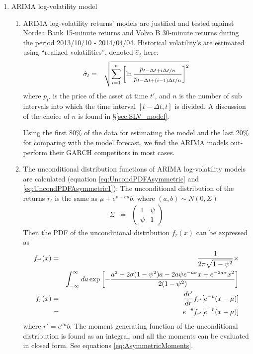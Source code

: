 \documentclass{report}
\begin{document}
\begin{enumerate}
\item ARIMA log-volatility model
  \begin{enumerate}
  \item ARIMA log-volatility returns' models are justified and tested
    against Nordea Bank 15-minute returns and Volvo B 30-minute returns
    during the period 2013/10/10 - 2014/04/04. Historical volatility's
    are estimated using ``realized volatilities'', denoted
    $\hat{\sigma}_t$ here:
    \begin{eqnarray*}
      \hat{\sigma}_t &=& \sqrt{
        \sum_{i = 1}^n \left[\ln {p_{t - \Delta t + i \Delta t / n} \over
            p_{t - \Delta t + (i-1) \Delta t / n}} \right]^2
      }
    \end{eqnarray*}
    where $p_{t'}$ is the price of the asset at time $t'$, and $n$ is
    the number of sub intervals into which the time interval $[t -
    \Delta t, t]$ is divided. A discussion of the choice of $n$ is found
    in \S\ref{sec:SLV_model}.

    Using the first 80\% of the data for estimating the model and the
    last 20\% for comparing with the model forecast, we find the ARIMA
    models out-perform their GARCH competitors in most cases.

  \item The unconditional distribution functions of ARIMA
    log-volatility models are calculated (equation
    \ref{eq:UncondPDFAsymmetric} and \ref{eq:UncondPDFAsymmetric1}):
    The unconditional distribution of  the returns $r_t$ is the same as
    $\mu + e^{\bar{v} + \sigma a} b$, where $(a, b) \sim N(0, \Sigma)$
    \begin{eqnarray*}
      \Sigma &=&
      \begin{pmatrix}
        1 & \psi \\
        \psi & 1
      \end{pmatrix}
    \end{eqnarray*}
    Then the PDF of the unconditional distribution $f_r(x)$ can be expressed as
    \begin{eqnarray*}
      f_{r'}(x) &=& {1 \over 2\pi \sqrt{1 - \psi^2}} \times \\
      && \int_{-\infty}^\infty da \exp
      \left[- {
          a^2 + 2\sigma(1 - \psi^2)a - 2a\psi e^{-a\sigma} x + e^{-2a\sigma} x^2
          \over
          2(1 - \psi^2)
        }
      \right] \\
      f_r(x) &=&  \frac{d r'}{d r} f_{r'}[e^{-\bar{v}} (x - \mu)] \\
      &=& e^{-\bar{v}} f_{r'}[e^{-\bar{v}} (x-\mu)] \\
    \end{eqnarray*}
    where $r' = e^{\sigma a}b$. The moment generating function of the
    unconditional distribution is found as an integral, and all the
    moments can be evaluated in closed form. See equations
    \ref{eq:AsymmetricMoments}.
    

\end{enumerate}
\end{enumerate}
\end{document}
